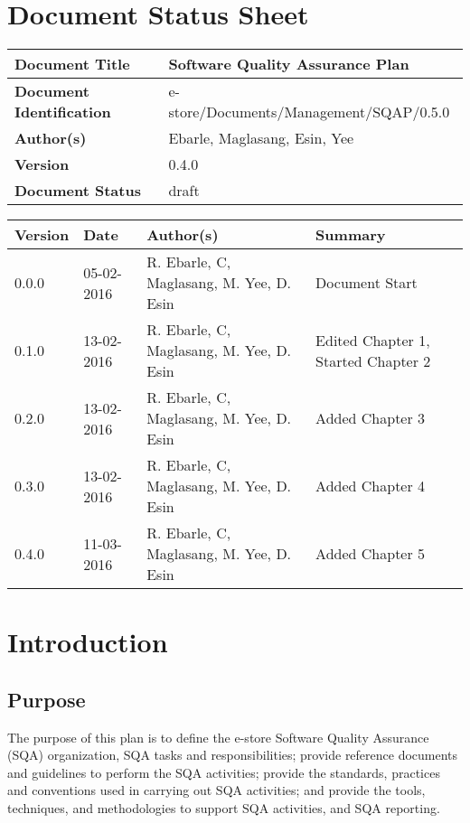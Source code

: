 \documentclass[12pt,letterpaper, margin=1in]{article}
\begin{document}
\section*{Document Status Sheet}
\begin{table}[ht]
\centering
\begin{adjustbox}{width=1\textwidth,center=\textwidth}
\small
\begin{tabular}{| l | l |}
\hline
\textbf{Document Title} & \textbf{Software Quality Assurance Plan} \\
\hline
\textbf{Document Identification} & e-store/Documents/Management/SQAP/0.5.0 \\ 
\textbf{Author(s)} & Ebarle, Maglasang, Esin, Yee \\
\textbf{Version} & 0.4.0 \\ 
\textbf{Document Status} & draft \\
\hline
\end{tabular}
\end{adjustbox}
\end{table}
\begin{table}[ht]
\centering
\begin{adjustbox}{width=1\textwidth,center=\textwidth}
\small
\begin{tabular}{| l | l | l | l |}
\hline
\textbf{Version} & \textbf{Date} & \textbf{Author(s)} & \textbf{Summary} \\
\hline
0.0.0 & 05-02-2016 & R. Ebarle, C, Maglasang, M. Yee, D. Esin & Document Start \\ 
0.1.0 & 13-02-2016 & R. Ebarle, C, Maglasang, M. Yee, D. Esin & Edited Chapter 1, Started Chapter 2 \\ 
0.2.0 & 13-02-2016 & R. Ebarle, C, Maglasang, M. Yee, D. Esin & Added Chapter 3 \\
0.3.0 & 13-02-2016 & R. Ebarle, C, Maglasang, M. Yee, D. Esin & Added Chapter 4 \\ 
0.4.0 & 11-03-2016 & R. Ebarle, C, Maglasang, M. Yee, D. Esin & Added Chapter 5 \\ 
\hline
\end{tabular}
\end{adjustbox}
\end{table}

\newpage
\section{Introduction}
\subsection{Purpose}
The purpose of this plan is to define the e-store Software Quality Assurance (SQA) organization, SQA tasks and responsibilities; provide reference documents and guidelines to perform the SQA activities; provide the standards, practices and conventions used in carrying out SQA activities; and provide the tools, techniques, and methodologies to support SQA activities, and SQA reporting.
	
\end{document}
